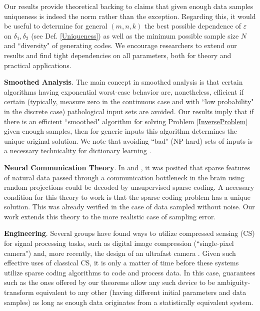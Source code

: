 \documentclass[journal, twocolumn]{IEEEtran}
\begin{document}
Our results provide theoretical backing to claims that given enough data samples uniqueness is indeed the norm rather than the exception. Regarding this, it would be useful to determine for general $(m,n,k)$ the best possible dependence of $\varepsilon$ on $\delta_1, \delta_2$ (see Def. \ref{Uniqueness}) as well as the minimum possible sample size $N$ and ``diversity" of generating codes. We encourage researchers to extend our results and find tight dependencies on all parameters, both for theory and practical applications.

\textbf{Smoothed Analysis}.
The main concept in smoothed analysis \cite{Spielman04} is that certain algorithms having exponential worst-case behavior are, nonetheless, efficient if certain (typically, measure zero in the continuous case and with ``low probability" in the discrete case) pathological input sets are avoided. Our results imply that if there is an efficient ``smoothed" algorithm for solving Problem \ref{InverseProblem} given enough samples, then for generic inputs this algorithm determines the unique original solution. We note that avoiding ``bad" (NP-hard) sets of inputs is a necessary technicality for dictionary learning \cite{Razaviyayn15, Tillmann15}.

\textbf{Neural Communication Theory}.
In \cite{Coulter10} and \cite{Isely10}, it was posited that sparse features of natural data passed through a communication bottleneck in the brain using random projections could be decoded by unsupervised sparse coding.  A necessary condition for this theory to work is that the sparse coding problem has a unique solution.  This was already verified in the case of data sampled without noise.  Our work extends this theory to the more realistic case of sampling error.

\textbf{Engineering}.
Several groups have found ways to utilize compressed sensing (CS) for signal processing tasks, such as digital image compression \cite{Duarte08} (``single-pixel camera") and, more recently, the design of an ultrafast camera \cite{Gao14}. Given such effective uses of classical CS, it is only a matter of time before these systems utilize sparse coding algorithms to code and process data. In this case, guarantees such as the ones offered by our theorems allow any such device to be ambiguity-transform equivalent to any other (having different initial parameters and data samples) as long as enough data originates from a statistically equivalent system.
\end{document}
